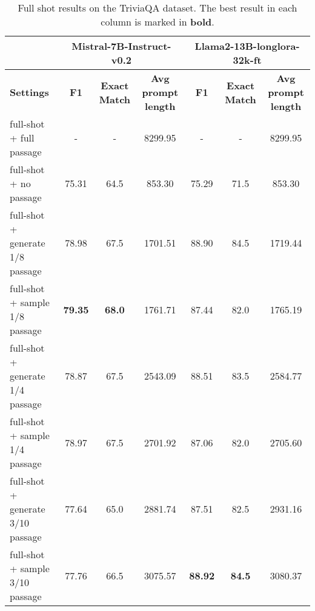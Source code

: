 \begin{table*}[tp]
\renewcommand\arraystretch{1.1}
\setlength{\tabcolsep}{4pt}
\centering
\small
\begin{tabular}{l|ccc|ccc}
\bottomrule
  \multicolumn{1}{l}{} & \multicolumn{3}{c}{\textbf{Mistral-7B-Instruct-v0.2}} & \multicolumn{3}{c}{\textbf{Llama2-13B-longlora-32k-ft}}\\
\hline
\textbf{Settings} & \textbf{F1} & \textbf{Exact Match} & \textbf{Avg prompt length}  & \textbf{F1} & \textbf{Exact Match} & \textbf{Avg prompt length}\\
\hline
full-shot + full passage & - & - & 8299.95 & - & - & 8299.95\\
full-shot + no passage & 75.31 & 64.5 & 853.30 & 75.29 & 71.5 & 853.30\\
full-shot + generate 1/8 passage & 78.98 & 67.5 & 1701.51 & 88.90 & 84.5 & 1719.44\\
full-shot + sample 1/8 passage & \textbf{79.35} & \textbf{68.0} & 1761.71 & 87.44 & 82.0 &1765.19\\
full-shot + generate 1/4 passage & 78.87 & 67.5 & 2543.09 & 88.51 & 83.5 & 2584.77\\
full-shot + sample 1/4 passage & 78.97 & 67.5 & 2701.92 & 87.06 & 82.0 & 2705.60\\
full-shot + generate 3/10 passage & 77.64 & 65.0 & 2881.74 & 87.51 & 82.5 & 2931.16\\
full-shot + sample 3/10 passage & 77.76 & 66.5 & 3075.57 & \textbf{88.92} & \textbf{84.5} & 3080.37\\
\toprule
\end{tabular}
\caption{Full shot results
on the TriviaQA dataset. The best result in each column is marked in \textbf{bold}.}
\label{tab:tqa_main}
\end{table*}